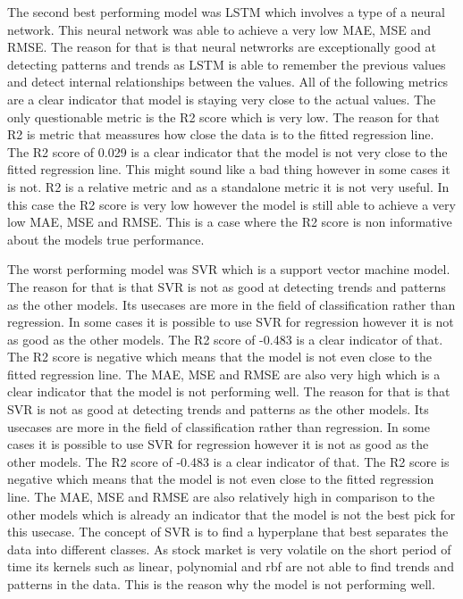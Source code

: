 \documentclass{imc-inf}
\begin{document}
	The second best performing model was LSTM which involves a type of a neural network. This neural network was able to achieve a very low MAE, MSE and RMSE. The reason for that is that neural netwrorks are exceptionally good at detecting 
	patterns and trends as LSTM is able to remember the previous values and detect internal relationships between the values. All of the following metrics are a clear indicator that model is staying very close to the actual values.
	The only questionable metric is the R2 score which is very low. The reason for that R2 is metric that meassures how close the data is to the fitted regression line. The R2 score of 0.029 is a clear indicator that the model is not very close to the fitted regression line. 
	This might sound like a bad thing however in some cases it is not. R2 is a relative metric and as a standalone metric it is not very useful. In this case the R2 score is very low however the model is still able to achieve a very low MAE, MSE and RMSE. This is a case where the R2 score is non informative about the models true performance.
	
	The worst performing model was SVR which is a support vector machine model. The reason for that is that SVR is not as good at detecting trends and patterns as the other models. Its usecases are more in the field of classification rather than regression. In some cases it is possible to use SVR for regression however it is not as good as the other models. The R2 score of -0.483 is a clear indicator of that.
	The R2 score is negative which means that the model is not even close to the fitted regression line. The MAE, MSE and RMSE are also very high which is a clear indicator that the model is not performing well. The reason for that is that SVR is not as good at detecting trends and patterns as the other models. Its usecases are more in the field of classification rather than regression.
	In some cases it is possible to use SVR for regression however it is not as good as the other models. The R2 score of -0.483 is a clear indicator of that. The R2 score is negative which means that the model is not even close to the fitted regression line. The MAE, MSE and RMSE are also relatively high in comparison to the other models which is already an indicator that the model is not the best pick for this usecase.
	The concept of SVR is to find a hyperplane that best separates the data into different classes. As stock market is very volatile on the short period of time its kernels such as linear, polynomial and rbf are not able to find trends and patterns in the data. This is the reason why the model is not performing well.
	
\end{document}
